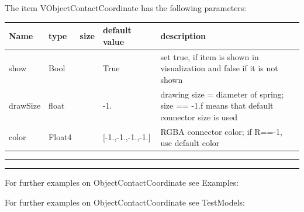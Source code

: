 The item VObjectContactCoordinate has the following parameters:\vspace{-1cm}\\ 
\begin{center}
  \footnotesize
  \begin{longtable}{| p{4.5cm} | p{2.5cm} | p{0.5cm} | p{2.5cm} | p{6cm} |}
    \hline
    \bf Name & \bf type & \bf size & \bf default value & \bf description \\ \hline
    show &     Bool &      &     True &     set true, if item is shown in visualization and false if it is not shown\\ \hline
    drawSize &     float &      &     -1. &     drawing size = diameter of spring; size == -1.f means that default connector size is used\\ \hline
    color &     Float4 &      &     [-1.,-1.,-1.,-1.] &     RGBA connector color; if R==-1, use default color\\ \hline
	  \end{longtable}
	\end{center}
\par\noindent\rule{\textwidth}{0.4pt}
\label{description_ObjectContactCoordinate}
\vspace{6pt}\par\noindent\rule{\textwidth}{0.4pt}
%
\noindent For further examples on ObjectContactCoordinate see Examples:
\bi
\item{}\item{}\ei

%
%
\noindent For further examples on ObjectContactCoordinate see TestModels:
\bi
\item{}\ei

%
\newpage

